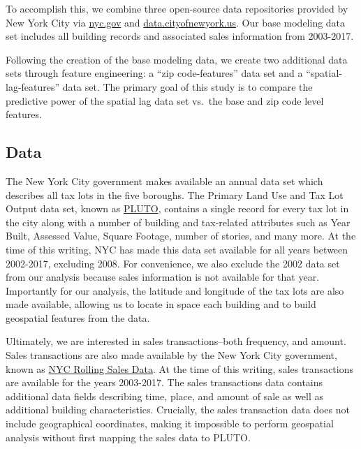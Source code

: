 \documentclass[]{article}
\begin{document}
To accomplish this, we combine three open-source data repositories
provided by New York City via \url{nyc.gov} and
\url{data.cityofnewyork.us}. Our base modeling data set includes all
building records and associated sales information from 2003-2017.

Following the creation of the base modeling data, we create two
additional data sets through feature engineering: a ``zip
code-features'' data set and a ``spatial-lag-features'' data set. The
primary goal of this study is to compare the predictive power of the
spatial lag data set vs.~the base and zip code level features.

\subsection{Data}\label{data}

The New York City government makes available an annual data set which
describes all tax lots in the five boroughs. The Primary Land Use and
Tax Lot Output data set, known as
\href{https://www1.nyc.gov/site/planning/data-maps/open-data/bytes-archive.page?sorts\%5Byear\%5D=0}{PLUTO},
contains a single record for every tax lot in the city along with a
number of building and tax-related attributes such as Year Built,
Assessed Value, Square Footage, number of stories, and many more. At the
time of this writing, NYC has made this data set available for all years
between 2002-2017, excluding 2008. For convenience, we also exclude the
2002 data set from our analysis because sales information is not
available for that year. Importantly for our analysis, the latitude and
longitude of the tax lots are also made available, allowing us to locate
in space each building and to build geospatial features from the data.

Ultimately, we are interested in sales transactions--both frequency, and
amount. Sales transactions are also made available by the New York City
government, known as
\href{http://www1.nyc.gov/site/finance/taxes/property-annualized-sales-update.page}{NYC
Rolling Sales Data}. At the time of this writing, sales transactions are
available for the years 2003-2017. The sales transactions data contains
additional data fields describing time, place, and amount of sale as
well as additional building characteristics. Crucially, the sales
transaction data does not include geographical coordinates, making it
impossible to perform geospatial analysis without first mapping the
sales data to PLUTO.
\end{document}
